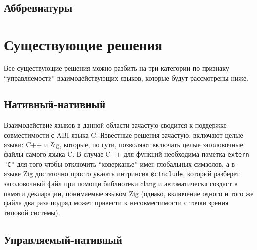 \documentclass[times,specification,annotation]{itmo-student-thesis}
\begin{document}
\subsection{Аббревиатуры}

\startrelatedwork

\section{Существующие решения}
Все существующие решения можно разбить на три категории по признаку ``управляемости'' взаимодействующих языков, которые будут рассмотрены ниже.

\subsection{Нативный-нативный}
Взаимодействие языков в данной области зачастую сводится к поддержке совместимости с ABI языка C. Известные решения зачастую, включают целые языки: C++ и Zig, которые, по сути, позволяют включать целые заголовочные файлы самого языка C. В случае C++ для функций необходима пометка \texttt{extern "C"} для того чтобы отключить ``коверканье'' имен глобальных символов, а в языке Zig достаточно просто указать интринсик \texttt{@cInclude}, который разберет заголовочный файл при помощи библиотеки clang и автоматически создаст в памяти декларации, понимаемые языком Zig (однако, включение одного и того же файла два раза подряд может привести к несовместимости с точки зрения типовой системы).

\subsection{Управляемый-нативный}
\end{document}
